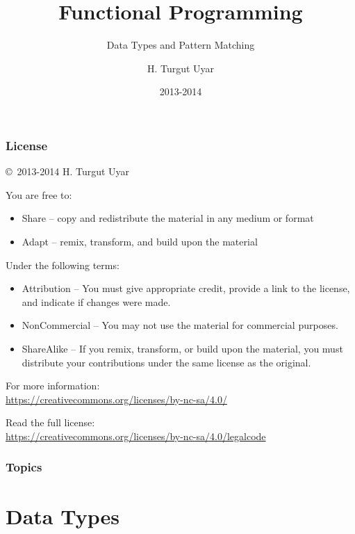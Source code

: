 \documentclass[dvipsnames]{beamer}
\title{Functional Programming}
\subtitle{Data Types and Pattern Matching}
\author{H. Turgut Uyar}
\date{2013-2014}
\theoremstyle{plain}
\begin{document}

\begin{frame}
  \titlepage
\end{frame}

\begin{frame}
  \frametitle{License}

  \hfill
  \copyright~2013-2014 H. Turgut Uyar

  \vfill
  \begin{footnotesize}
    You are free to:
    \begin{itemize}
      \itemsep0em
      \item Share -- copy and redistribute the material in any medium or format
      \item Adapt -- remix, transform, and build upon the material
    \end{itemize}

    Under the following terms:
    \begin{itemize}
      \itemsep0em
      \item Attribution -- You must give appropriate credit, provide a link to
        the license, and indicate if changes were made.

      \item NonCommercial -- You may not use the material for commercial
        purposes.

      \item ShareAlike -- If you remix, transform, or build upon the material,
        you must distribute your contributions under the same license as the
        original.
    \end{itemize}
  \end{footnotesize}

  \begin{small}
    For more information:\\
    \url{https://creativecommons.org/licenses/by-nc-sa/4.0/}

    \smallskip
    Read the full license:\\
    \url{https://creativecommons.org/licenses/by-nc-sa/4.0/legalcode}
  \end{small}
\end{frame}

\begin{frame}
  \frametitle{Topics}
  \tableofcontents
\end{frame}

\section{Data Types}
\end{document}
